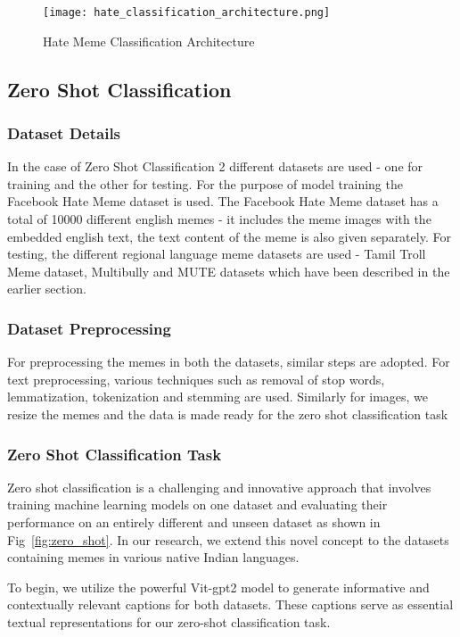 \documentclass{ieeeaccess}
\begin{document}
\begin{figure}[htbp]
\centering
\texttt{[image: hate\_classification\_architecture.png]}
\caption{Hate Meme Classification Architecture}
\label{fig:hate_classification}
\end{figure}

\subsection{Zero Shot Classification}

\subsubsection{Dataset Details}
In the case of Zero Shot Classification 2 different datasets are used - one for training and the other for testing. For the purpose of model training the Facebook Hate Meme dataset is used. The Facebook Hate Meme dataset has a total of 10000 different english memes - it includes the meme images with the embedded english text, the text content of the meme is also given separately. For testing, the different regional language meme datasets are used - Tamil Troll Meme dataset, Multibully and MUTE datasets which have been described in the earlier section.

\subsubsection{Dataset Preprocessing}
For preprocessing the memes in both the datasets, similar steps are adopted. For text preprocessing, various techniques such as removal of stop words, lemmatization, tokenization and stemming are used. Similarly for images, we resize the memes and the data is made ready for the zero shot classification task

\subsubsection{Zero Shot Classification Task}
Zero shot classification is a challenging and innovative approach that involves training machine learning models on one dataset and evaluating their performance on an entirely different and unseen dataset as shown in Fig~\ref{fig:zero_shot}. In our research, we extend this novel concept to the datasets containing memes in various native Indian languages.

To begin, we utilize the powerful Vit-gpt2 model to generate informative and contextually relevant captions for both datasets. These captions serve as essential textual representations for our zero-shot classification task.
\end{document}
